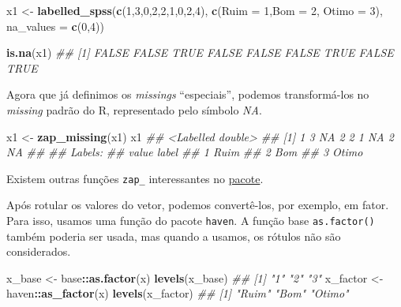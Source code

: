 \documentclass[]{book}
\newenvironment{Shaded}{\begin{snugshade}}{\end{snugshade}}
\newcommand{\CommentTok}[1]{\textcolor[rgb]{0.56,0.35,0.01}{\textit{#1}}}
\newcommand{\DataTypeTok}[1]{\textcolor[rgb]{0.13,0.29,0.53}{#1}}
\newcommand{\DecValTok}[1]{\textcolor[rgb]{0.00,0.00,0.81}{#1}}
\newcommand{\KeywordTok}[1]{\textcolor[rgb]{0.13,0.29,0.53}{\textbf{#1}}}
\newcommand{\NormalTok}[1]{#1}
\newcommand{\OperatorTok}[1]{\textcolor[rgb]{0.81,0.36,0.00}{\textbf{#1}}}
\newcommand{\StringTok}[1]{\textcolor[rgb]{0.31,0.60,0.02}{#1}}
\begin{document}
\begin{Shaded}
\begin{Highlighting}[]
\NormalTok{x1 <-}\StringTok{ }\KeywordTok{labelled_spss}\NormalTok{(}\KeywordTok{c}\NormalTok{(}\DecValTok{1}\NormalTok{,}\DecValTok{3}\NormalTok{,}\DecValTok{0}\NormalTok{,}\DecValTok{2}\NormalTok{,}\DecValTok{2}\NormalTok{,}\DecValTok{1}\NormalTok{,}\DecValTok{0}\NormalTok{,}\DecValTok{2}\NormalTok{,}\DecValTok{4}\NormalTok{), }\KeywordTok{c}\NormalTok{(}\DataTypeTok{Ruim =} \DecValTok{1}\NormalTok{,}\DataTypeTok{Bom =} \DecValTok{2}\NormalTok{, }\DataTypeTok{Otimo =} \DecValTok{3}\NormalTok{), }\DataTypeTok{na_values =} \KeywordTok{c}\NormalTok{(}\DecValTok{0}\NormalTok{,}\DecValTok{4}\NormalTok{))}
    
\KeywordTok{is.na}\NormalTok{(x1)}
\CommentTok{## [1] FALSE FALSE  TRUE FALSE FALSE FALSE  TRUE FALSE  TRUE}
\end{Highlighting}
\end{Shaded}

Agora que já definimos os \emph{missings} ``especiais'', podemos transformá-los no \emph{missing} padrão do R, representado pelo símbolo \emph{NA}.

\begin{Shaded}
\begin{Highlighting}[]
\NormalTok{x1 <-}\StringTok{ }\KeywordTok{zap_missing}\NormalTok{(x1)}
\NormalTok{x1}
\CommentTok{## <Labelled double>}
\CommentTok{## [1]  1  3 NA  2  2  1 NA  2 NA}
\CommentTok{## }
\CommentTok{## Labels:}
\CommentTok{##  value label}
\CommentTok{##      1  Ruim}
\CommentTok{##      2   Bom}
\CommentTok{##      3 Otimo}
\end{Highlighting}
\end{Shaded}

Existem outras funções \texttt{zap\_} interessantes no \href{https://cran.r-project.org/web/packages/haven/haven.pdf}{pacote}.

Após rotular os valores do vetor, podemos convertê-los, por exemplo, em fator. Para isso, usamos uma função do pacote \texttt{haven}.
A função base \texttt{as.factor()} também poderia ser usada, mas quando a usamos, os rótulos não são considerados.

\begin{Shaded}
\begin{Highlighting}[]
\NormalTok{x_base <-}\StringTok{ }\NormalTok{base}\OperatorTok{::}\KeywordTok{as.factor}\NormalTok{(x)}
\KeywordTok{levels}\NormalTok{(x_base)}
\CommentTok{## [1] "1" "2" "3"}
\NormalTok{x_factor <-}\StringTok{ }\NormalTok{haven}\OperatorTok{::}\KeywordTok{as_factor}\NormalTok{(x)}
\KeywordTok{levels}\NormalTok{(x_factor)}
\CommentTok{## [1] "Ruim"  "Bom"   "Otimo"}
\end{Highlighting}
\end{Shaded}
\end{document}
